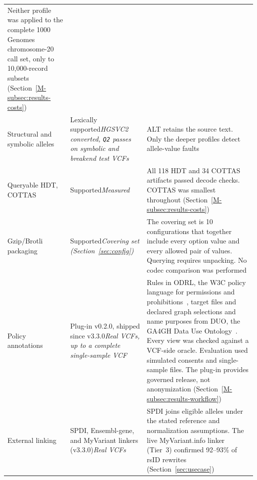 \documentclass[11pt]{article}
\newcommand{\rowsep}{\noalign{\vskip2pt{\color{black!22}\hrule height 0.4pt}\vskip2pt}}%
\begin{document}
\begin{table}[!htbp]
\begin{tabularx}{\textwidth}{@{}>{\raggedright\arraybackslash}m{}>{\raggedright\arraybackslash}m{}>{\raggedright\arraybackslash}X@{}}
Neither profile was applied to the complete 1000 Genomes chromosome-20 call set, only to 10{,}000-record subsets (Section~\ref{M-subsec:results-costs})\\
\rowsep
Structural and symbolic alleles & Lexically supported\newline\textit{HGSVC2 converted, \texttt{Q2} passes on symbolic and breakend test VCFs} & ALT retains the source text.
Only the deeper profiles detect allele-value faults\\
\rowsep
Queryable HDT, COTTAS & Supported\newline\textit{Measured} & All 118 HDT and 34 COTTAS artifacts passed decode checks.
COTTAS was smallest throughout (Section~\ref{M-subsec:results-costs})\\
\rowsep
Gzip/Brotli packaging & Supported\newline\textit{Covering set (Section~\ref{sec:config})} & The covering set is 10 configurations that together include every option value and every allowed pair of values.
Querying requires unpacking.
No codec comparison was performed\\
\rowsep
Policy annotations & Plug-in v0.2.0, shipped since v3.3.0\newline\textit{Real VCFs, up to a complete single-sample VCF} & Rules in ODRL, the W3C policy language for permissions and prohibitions~\cite{odrl_2018}, target files and declared graph selections and name purposes from DUO, the GA4GH Data Use Ontology~\cite{lawson2021duo}.
Every view was checked against a VCF-side oracle.
Evaluation used simulated consents and single-sample files.
The plug-in provides governed release, not anonymization (Section~\ref{M-subsec:results-workflow})\\
\rowsep
External linking & SPDI, Ensembl-gene, and MyVariant linkers (v3.3.0)\newline\textit{Real VCFs} & SPDI joins eligible alleles under the stated reference and normalization assumptions.
The live MyVariant.info linker (Tier~3) confirmed 92--93\% of rsID rewrites (Section~\ref{sec:usecase})\\
\bottomrule
\end{tabularx}
\end{table}
\end{document}
